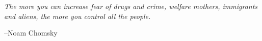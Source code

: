 \documentclass[fleqn,addpoints]{exam}
\begin{document}
\ifprintanswers

\fi

\ifprintanswers
\else
\vspace{7 cm}

{\em The more you can increase fear of drugs and crime, welfare mothers, immigrants and aliens, the more you control all
the people. }

\vspace{.1 cm}
\hspace{1 cm} --Noam Chomsky

\fi
\end{document}
